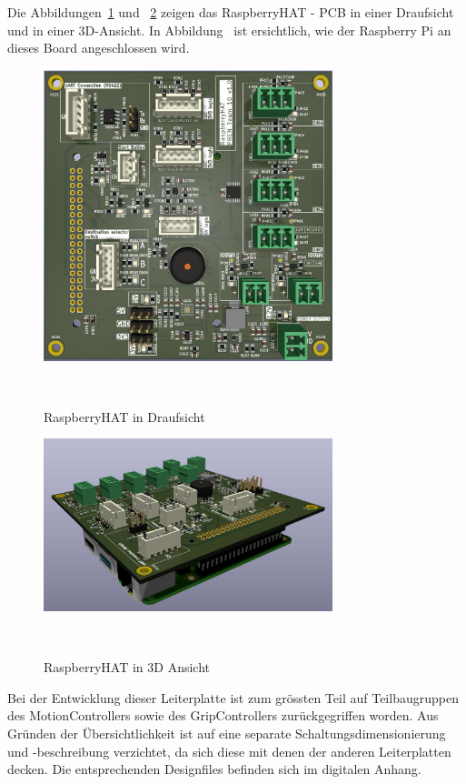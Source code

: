 \documentclass[main.tex]{subfiles} %
\begin{document}
Die Abbildungen~\ref{fig:RaspberryHAT_draufsicht} und
~\ref{fig:RaspberryHAT_3D} zeigen das RaspberryHAT - PCB in einer Draufsicht
und in einer 3D-Ansicht. In Abbildung~\label{fig:RaspberryHAT_3D} ist
ersichtlich, wie der Raspberry Pi an dieses Board angeschlossen wird.

\begin{figure}[H]
      \centering
      \includegraphics[width=0.75\textwidth]{./fig_RaspberryHAT/RaspberryHAT_draufsicht.png}
      \caption{RaspberryHAT in Draufsicht}~\label{fig:RaspberryHAT_draufsicht}
\end{figure}

\begin{figure}[H]
      \centering
      \includegraphics[width=0.75\textwidth]{./fig_RaspberryHAT/RaspberryHAT_3D.png}
      \caption{RaspberryHAT in 3D Ansicht}~\label{fig:RaspberryHAT_3D}
\end{figure}

Bei der Entwicklung dieser Leiterplatte ist zum grössten Teil auf
Teilbaugruppen des MotionControllers sowie des GripControllers zurückgegriffen
worden. Aus Gründen der Übersichtlichkeit ist auf eine separate
Schaltungsdimensionierung und -beschreibung verzichtet, da sich diese mit denen
der anderen Leiterplatten decken. Die entsprechenden Designfiles befinden sich
im digitalen Anhang.
\end{document}
